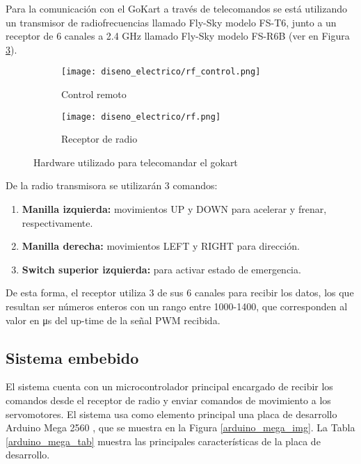 Para la comunicación con el GoKart a través de telecomandos se está utilizando un transmisor de radiofrecuencias llamado Fly-Sky modelo FS-T6, junto a un receptor de 6 canales a 2.4 GHz llamado Fly-Sky modelo FS-R6B (ver en Figura \ref{rf}).

\begin{figure}[H]
    \centering
    \begin{subfigure}[b]{0.3\textwidth}
        \centering
        \texttt{[image: diseno\_electrico/rf\_control.png]}
        \caption{Control remoto}
        \label{rf_control}
    \end{subfigure}
    \begin{subfigure}[b]{0.3\textwidth}
        \centering
        \texttt{[image: diseno\_electrico/rf.png]}
	    \caption{Receptor de radio}
	    \label{rf_img}
    \end{subfigure}
    \caption{Hardware utilizado para telecomandar el gokart}\label{rf}
\end{figure}

De la radio transmisora se utilizarán 3 comandos:
\begin{enumerate}
    \item {\textbf{Manilla izquierda:} movimientos UP y DOWN para acelerar y frenar, respectivamente.}
    \item {\textbf{Manilla derecha: } movimientos LEFT y RIGHT para dirección.}
    \item {\textbf{Switch superior izquierda:} para activar estado de emergencia. }
\end{enumerate}

De esta forma, el receptor utiliza 3 de sus 6 canales para recibir los datos, los que resultan ser números enteros con un rango entre 1000-1400, que corresponden al valor en \si{\micro\second} del up-time de la señal PWM recibida.

\subsection{Sistema embebido}

El sistema cuenta con un microcontrolador principal encargado de recibir los comandos desde el receptor de radio y enviar comandos de movimiento a los servomotores. El sistema usa como elemento principal una placa de desarrollo Arduino Mega 2560 \cite{arduino_mega}, que se muestra en la Figura \ref{arduino_mega_img}. La Tabla \ref{arduino_mega_tab} muestra las principales características de la placa de desarrollo.

